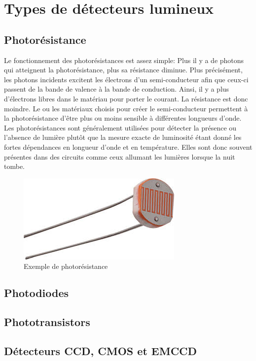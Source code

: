 \documentclass[12pt,oneside,letterpaper]{article}
\begin{document}
\section{Types de détecteurs lumineux}

\subsection{Photorésistance}
Le fonctionnement des photorésistances est assez simple: Plus il y a de photons qui atteignent la photorésistance, plus sa résistance diminue. Plus précisément, les photons incidents excitent les électrons d'un semi-conducteur afin que ceux-ci passent de la bande de valence à la bande de conduction. Ainsi, il y a plus d'électrons libres dans le matériau pour porter le courant. La résistance est donc moindre. Le ou les matériaux choisis pour créer le semi-conducteur permettent à la photorésistance d'être plus ou moins sensible à différentes longueurs d'onde. Les photorésistances sont généralement utilisées pour détecter la présence ou l'absence de lumière plutôt que la mesure exacte de luminosité étant donné les fortes dépendances en longueur d'onde et en température. Elles sont donc souvent présentes dans des circuits comme ceux allumant les lumières lorsque la nuit tombe.
\begin{figure}
    \centering
    \includegraphics[scale = 0.4]{Labos-Complements/Lab09/LabDD/Figures/photoresistance.jpg}
    \caption{Exemple de photorésistance}
    \label{fig:enter-label}
\end{figure}
\subsection{Photodiodes}

\subsection{Phototransistors}
\subsection{Détecteurs CCD, CMOS et EMCCD}
\end{document}
